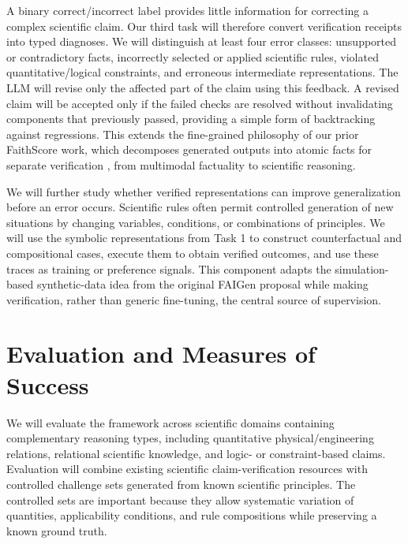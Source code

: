 \documentclass[12pt]{article}
\begin{document}
A binary correct/incorrect label provides little information for correcting a complex scientific claim. Our third task will therefore convert verification receipts into typed diagnoses. We will distinguish at least four error classes: unsupported or contradictory facts, incorrectly selected or applied scientific rules, violated quantitative/logical constraints, and erroneous intermediate representations. The LLM will revise only the affected part of the claim using this feedback. A revised claim will be accepted only if the failed checks are resolved without invalidating components that previously passed, providing a simple form of backtracking against regressions. This extends the fine-grained philosophy of our prior FaithScore work, which decomposes generated outputs into atomic facts for separate verification \citep{jing2024faithscore}, from multimodal factuality to scientific reasoning.

We will further study whether verified representations can improve generalization before an error occurs. Scientific rules often permit controlled generation of new situations by changing variables, conditions, or combinations of principles. We will use the symbolic representations from Task 1 to construct counterfactual and compositional cases, execute them to obtain verified outcomes, and use these traces as training or preference signals. This component adapts the simulation-based synthetic-data idea from the original FAIGen proposal while making verification, rather than generic fine-tuning, the central source of supervision.

\section*{Evaluation and Measures of Success}

We will evaluate the framework across scientific domains containing complementary reasoning types, including quantitative physical/engineering relations, relational scientific knowledge, and logic- or constraint-based claims. Evaluation will combine existing scientific claim-verification resources with controlled challenge sets generated from known scientific principles. The controlled sets are important because they allow systematic variation of quantities, applicability conditions, and rule compositions while preserving a known ground truth.
\end{document}
